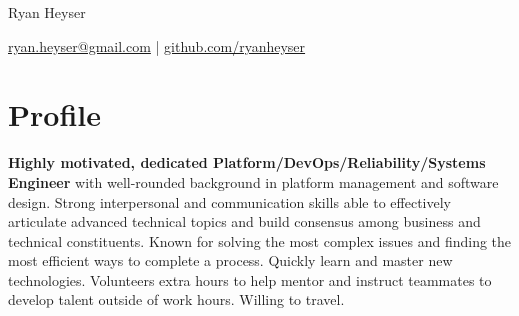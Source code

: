 \documentclass[11pt]{article}       %
\begin{document}
\centerline{\Huge Ryan Heyser}

\vspace{5pt}

\centerline{\href{mailto:ryan.heyser@gmail.com}{ryan.heyser@gmail.com} | \href{github.com/ryanheyser}{github.com/ryanheyser}}

\vspace{-18.5pt}

\section*{Profile}
\begin{description}
\item\textbf{Highly motivated, dedicated Platform/DevOps/Reliability/Systems Engineer} with well-rounded background in platform management and software design. Strong interpersonal and communication skills able to effectively articulate advanced technical topics and build consensus among business and technical constituents. Known for solving the most complex issues and finding the most efficient ways to complete a process. Quickly learn and master new technologies. Volunteers extra hours to help mentor and instruct teammates to develop talent outside of work hours. Willing to travel. \\
\end{description}

\vspace{-18.5pt}

\end{document}
